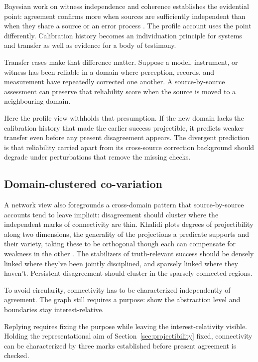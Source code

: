 \documentclass[12pt]{article}
\begin{document}
Bayesian work on witness independence and coherence establishes the evidential point:
agreement confirms more when sources are sufficiently independent than when they
share a source or an error process
\citep{bovens_hartmann_2003_bayesian_epistemology,olsson_2005_against_coherence}. The
profile account uses the point differently. Calibration history becomes an individuation
principle for systems and transfer as well as evidence for a body of testimony.

Transfer cases make that difference matter. Suppose a model, instrument, or witness has
been reliable in a domain
where perception, records, and measurement have repeatedly corrected one another. A
source-by-source assessment can preserve that reliability score when the source is moved
to a neighbouring domain.

Here the profile view withholds that presumption. If the new domain lacks the calibration
history that made the earlier success projectible, it predicts weaker
transfer even before any present disagreement appears. The divergent prediction is that
reliability carried apart from its cross-source correction background should degrade
under perturbations that remove the missing checks.

\subsection{Domain-clustered co-variation}

A network view also foregrounds a cross-domain pattern that source-by-source accounts
tend to leave implicit: disagreement should cluster where the independent marks of
connectivity are thin. Khalidi plots degrees of projectibility along two dimensions, the generality of the
projections a predicate supports and their variety, taking these to be orthogonal though
each can compensate for weakness in the other
\citep{khalidi_2018_natural_kinds_nodes_causal_networks}. The
stabilizers of truth-relevant success should be densely linked where they've been
jointly disciplined, and sparsely linked where they haven't. Persistent disagreement
should cluster in the sparsely connected regions.

To avoid circularity, connectivity has to be characterized independently of agreement. The
graph still requires a purpose:
\textcite{onishi_serpico_2022} show the abstraction level and boundaries stay
interest-relative.

Replying requires fixing the purpose while leaving the interest-relativity visible.
Holding the representational aim of Section~\ref{sec:projectibility} fixed, connectivity can be
characterized by three marks established before present agreement is checked.
\end{document}

